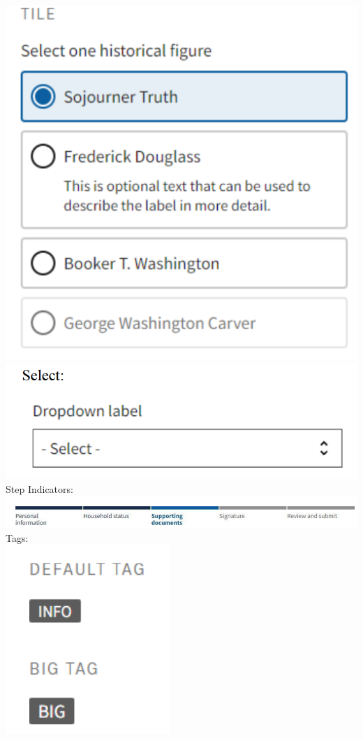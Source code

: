 \documentclass{article}
\begin{document}
\includegraphics{footers} \\
\includegraphics{radiobuttons} \\
Step Indicators: \\
\includegraphics{step_indicator} \\
Tags: \\
\includegraphics{tags} \\
\end{document}
